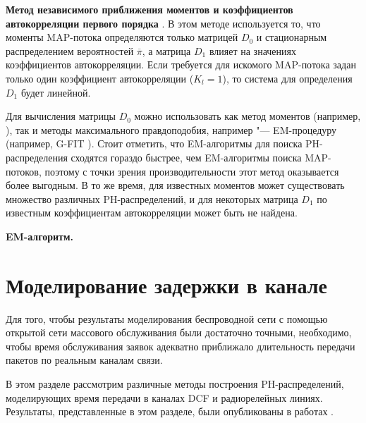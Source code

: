 \textbf{Метод независимого приближения моментов и коэффициентов автокорреляции первого порядка} \cite{Horvath2005}. В этом методе используется то, что моменты MAP-потока определяются только матрицей $D_0$ и стационарным распределением вероятностей $\overline{\pi}$, а матрица $D_1$ влияет на значениях коэффициентов автокорреляции. Если требуется для искомого MAP-потока задан только один коэффициент автокорреляции ($K_l = 1$), то система для определения $D_1$ будет линейной.

Для вычисления матрицы $D_0$ можно использовать как метод моментов (например, \cite{Bobbio2005}), так и методы максимального правдоподобия, например "--- EM-процедуру (например, G-FIT \cite{Thummler2005}). Стоит отметить, что EM-алгоритмы для поиска PH-распределения сходятся гораздо быстрее, чем EM-алгоритмы поиска MAP-потоков, поэтому с точки зрения производительности этот метод оказывается более выгодным. В то же время, для известных моментов может существовать множество различных PH-распределений, и для некоторых матрица $D_1$ по известным коэффициентам автокорреляции может быть не найдена.




\textbf{EM-алгоритм.}







\section{Моделирование задержки в канале}\label{sec:ch4_service_time}
Для того, чтобы результаты моделирования беспроводной сети с помощью открытой сети массового обслуживания были достаточно точными, необходимо, чтобы время обслуживания заявок адекватно приближало длительность передачи пакетов по реальным каналам связи.

В этом разделе рассмотрим различные методы построения PH-распределений, моделирующих время передачи в каналах DCF и радиорелейных линиях. Результаты, представленные в этом разделе, были опубликованы в работах \cite{QS_ITMM2019, QS_ICAAPSP2020}.



